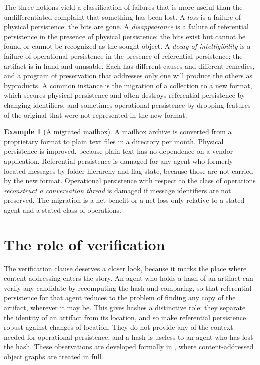 \documentclass[11pt,twoside,openright]{book}
\theoremstyle{plain}
\theoremstyle{definition}
\newtheorem{example}[theorem]{Example}
\theoremstyle{remark}
\begin{document}
The three notions yield a classification of failures that is more useful than the undifferentiated complaint that something has been lost. A \emph{loss} is a failure of physical persistence: the bits are gone. A \emph{disappearance} is a failure of referential persistence in the presence of physical persistence: the bits exist but cannot be found or cannot be recognized as the sought object. A \emph{decay of intelligibility} is a failure of operational persistence in the presence of referential persistence: the artifact is in hand and unusable. Each has different causes and different remedies, and a program of preservation that addresses only one will produce the others as byproducts. A common instance is the migration of a collection to a new format, which secures physical persistence and often destroys referential persistence by changing identifiers, and sometimes operational persistence by dropping features of the original that were not represented in the new format.

\begin{example}[A migrated mailbox]\label{ex:mailbox}
A mailbox archive is converted from a proprietary format to plain text files in a directory per month. Physical persistence is improved, because plain text has no dependence on a vendor application. Referential persistence is damaged for any agent who formerly located messages by folder hierarchy and flag state, because those are not carried by the new format. Operational persistence with respect to the class of operations \emph{reconstruct a conversation thread} is damaged if message identifiers are not preserved. The migration is a net benefit or a net loss only relative to a stated agent and a stated class of operations.
\end{example}

\section{The role of verification}

The verification clause deserves a closer look, because it marks the place where content addressing enters the story. An agent who holds a hash of an artifact can verify any candidate by recomputing the hash and comparing, so that referential persistence for that agent reduces to the problem of finding any copy of the artifact, wherever it may be. This gives hashes a distinctive role: they separate the identity of an artifact from its location, and so make referential persistence robust against changes of location. They do not provide any of the context needed for operational persistence, and a hash is useless to an agent who has lost the hash. These observations are developed formally in , where content-addressed object graphs are treated in full.
\end{document}
